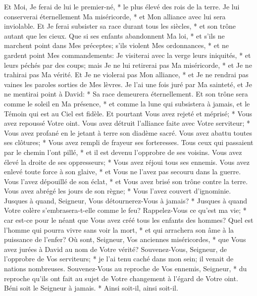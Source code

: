 Et Moi, Je ferai de lui le premier-né, * le plus élevé des rois de la terre.
Je lui conserverai éternellement Ma miséricorde, * et Mon alliance avec lui sera inviolable.
Et Je ferai subsister sa race durant tous les siècles, * et son trône autant que les cieux.
Que si ses enfants abandonnent Ma loi, * et s'ils ne marchent point dans Mes préceptes;
s'ils violent Mes ordonnances, * et ne gardent point Mes commandements:
Je visiterai avec la verge leurs iniquités, * et leurs péchés par des coups;
mais Je ne lui retirerai pas Ma miséricorde, * et Je ne trahirai pas Ma vérité.
Et Je ne violerai pas Mon alliance, * et Je ne rendrai pas vaines les paroles sorties de Mes lèvres.
Je l'ai une fois juré par Ma sainteté, et Je ne mentirai point à David: *
Sa race demeurera éternellement.
Et son trône sera comme le soleil en Ma présence, * et comme la lune qui subsistera à jamais, et le Témoin qui est au Ciel est fidèle.
Et pourtant Vous avez rejeté et méprisé; * Vous avez repoussé Votre oint.
Vous avez détruit l'alliance faite avec Votre serviteur; * Vous avez profané en le jetant à terre son diadème sacré.
Vous avez abattu toutes ses clôtures; * Vous avez rempli de frayeur ses forteresses.
Tous ceux qui passaient par le chemin l'ont pillé, * et il est devenu l'opprobre de ses voisins.
Vous avez élevé la droite de ses oppresseurs; * Vous avez réjoui tous ses ennemis.
Vous avez enlevé toute force à son glaive, * et Vous ne l'avez pas secouru dans la guerre.
Vous l'avez dépouillé de son éclat, * et Vous avez brisé son trône contre la terre.
Vous avez abrégé les jours de son règne; * Vous l'avez couvert d'ignominie.
Jusques à quand, Seigneur, Vous détournerez-Vous à jamais? * Jusques à quand Votre colère s'embrasera-t-elle comme le feu?
Rappelez-Vous ce qu'est ma vie; * car est-ce pour le néant que Vous avez créé tous les enfants des hommes?
Quel est l'homme qui pourra vivre sans voir la mort, * et qui arrachera son âme à la puissance de l'enfer?
Où sont, Seigneur, Vos anciennes miséricordes, * que Vous avez jurées à David au nom de Votre vérité?
Souvenez-Vous, Seigneur, de l'opprobre de Vos serviteurs; * je l'ai tenu caché dans mon sein; il venait de nations nombreuses.
Souvenez-Vous au reproche de Vos ennemis, Seigneur, * du reproche qu'ils ont fait au sujet de Votre changement à l'égard de Votre oint.
Béni soit le Seigneur à jamais. * Ainsi soit-il, ainsi soit-il.

